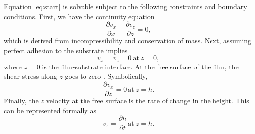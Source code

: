 \documentclass[aps, prl, twocolumn, groupedaddress]{revtex4-1}
\begin{document}
Equation \ref{eq:start} is solvable subject to the following
constraints and boundary conditions. First, we have the continuity
equation
\begin{equation}
\frac{\partial v_x}{\partial x}+\frac{\partial v_z}{\partial z} =0 \mathrm{,}
\label{eq:continuity}
\end{equation}
which is derived from incompressibility and conservation of
mass. Next, assuming perfect adhesion to the substrate implies
\begin{equation}
v_x=v_z=0 \mathrm{\ at\ } z=0 \mathrm{,} \label{eq:substrate}
\end{equation}
where $z=0$ is the film-substrate interface. At the free surface of
the film, the shear stress along $z$ goes to zero \cite{levich,
barrett}. Symbolically,
\begin{equation}
\frac{\partial v_x}{\partial z}=0 \mathrm{\ at\ } z=h \mathrm{.} \label{eq:shear}
\end{equation}
Finally, the $z$ velocity at the free surface is the rate of change in
the height. This can be represented formally as
\begin{equation}
v_z=\frac{\partial h}{\partial t} \mathrm{\ at\ } z=h \mathrm{.} \label{eq:vzbound}
\end{equation}
\end{document}
